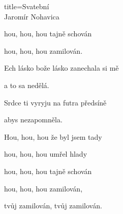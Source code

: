 \begin{song}{title=\predtitle\centering Svatební \\\large Jaromír Nohavica \vspace*{-0.3cm}}
\begin{centerjustified}
\begin{varwidth}[t]{0.48\textwidth}
hou, hou, hou tajně schován

hou, hou, hou zamilován.


\sloka
Ech lásko bože lásko zanechala si mě

a to sa nedělá.

Srdce ti vyryju na futra předsíně

abys nezapomněla.


Hou, hou, hou že byl jsem tady

hou, hou, hou umřel hlady

hou, hou, hou tajně schován

hou, hou, hou zamilován,

tvůj zamilován, tvůj zamilován.

\end{varwidth}

\end{centerjustified}

\centering
{}

\setcounter{Slokočet}{0}
\end{song}
